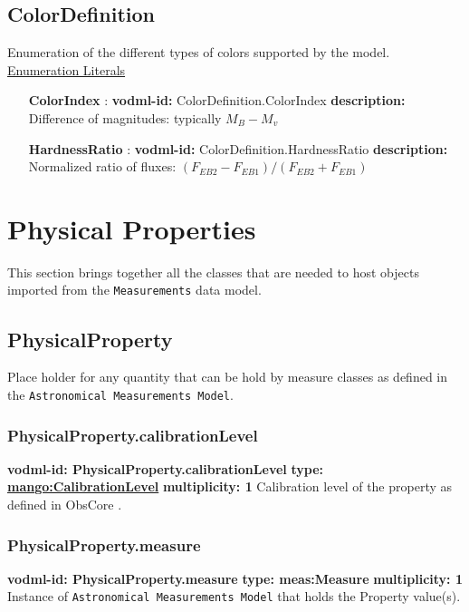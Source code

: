  \subsection{ColorDefinition}
    \label{sect:ColorDefinition}
    Enumeration of the different types of colors supported by the model.
    \noindent \underline{Enumeration Literals}
    \vspace{-\parsep}
    \small
    \begin{itemize}
    \item[\textbf{ColorIndex}]: \textbf{vodml-id:} ColorDefinition.ColorIndex \newline
    \textbf{description:} Difference of magnitudes: typically $M_B - M_v$
    \item[\textbf{HardnessRatio}]: \textbf{vodml-id:} ColorDefinition.HardnessRatio \newline
    \textbf{description:} Normalized ratio of fluxes: $(F_{EB2} - F_{EB1}) / (F_{EB2} + F_{EB1})$
    \end{itemize}
    \normalsize

\section{Physical Properties}
This section brings together all the classes that are needed to 
host objects imported from the \texttt{Measurements} data model. 
  \subsection{PhysicalProperty}
    \label{sect:PhysicalProperty}
    Place holder for any quantity that can be hold by measure classes as defined in the \texttt{Astronomical Measurements Model}.

    \subsubsection{PhysicalProperty.calibrationLevel}
    \textbf{vodml-id: PhysicalProperty.calibrationLevel} \newline
    \textbf{type: \hyperref[sect:CalibrationLevel]{mango:CalibrationLevel}} \newline
    \textbf{multiplicity: 1} \newline
    Calibration level of the property as defined in ObsCore \citep{2011ivoa.spec.1028T}.

    \subsubsection{PhysicalProperty.measure}
    \textbf{vodml-id: PhysicalProperty.measure} \newline
    \textbf{type: meas:Measure} \newline
    \textbf{multiplicity: 1} \newline
    Instance of \texttt{Astronomical Measurements Model} that holds the Property value(s).

